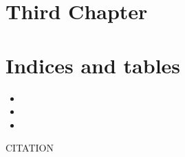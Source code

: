 \documentclass[letterpaper,10pt,english]{sphinxmanual}
\begin{document}
\chapter{Third Chapter}
\label{\detokenize{chapter2::doc}}\label{\detokenize{chapter2:third-chapter}}

\chapter{Indices and tables}
\label{\detokenize{index:indices-and-tables}}\begin{itemize}
\item {} 

\item {} 

\item {} 

\end{itemize}

\begin{sphinxthebibliography}{CITATION}
\end{sphinxthebibliography}



\renewcommand{\indexname}{Index}
\printindex
\end{document}
